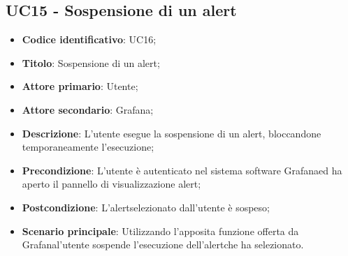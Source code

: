 \subsection{UC15 - Sospensione di un alert}
\begin{itemize}
	\item \textbf{Codice identificativo}: UC16;
	\item \textbf{Titolo}: Sospensione di un alert\glo;
	\item \textbf{Attore primario}: Utente;
	\item \textbf{Attore secondario}: Grafana\glo;
	\item \textbf{Descrizione}: L'utente esegue la sospensione di un alert\glosp, bloccandone temporaneamente l'esecuzione;
	\item \textbf{Precondizione}: L'utente è autenticato nel sistema software Grafana\glosp ed ha aperto il pannello di visualizzazione alert\glo;
	\item \textbf{Postcondizione}: L'alert\glosp selezionato dall'utente è sospeso;
	\item \textbf{Scenario principale}: Utilizzando l'apposita funzione offerta da Grafana\glosp l'utente sospende l'esecuzione dell'alert\glosp che ha selezionato.
\end{itemize} 
